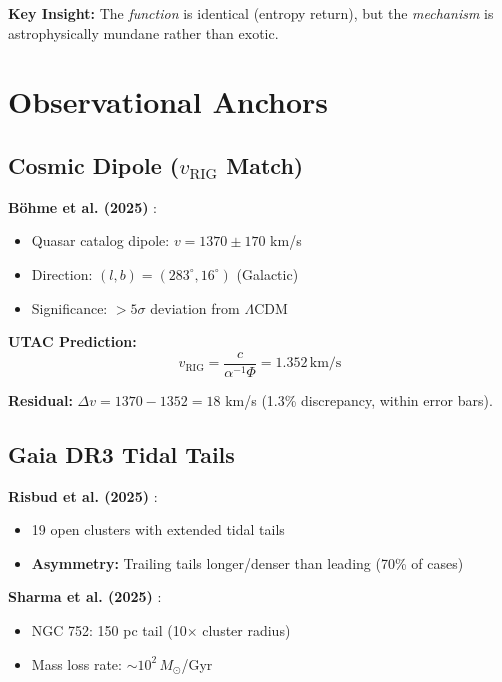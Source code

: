 \documentclass[11pt,a4paper,twocolumn]{article}
\begin{document}
\textbf{Key Insight:} The \emph{function} is identical (entropy return), but the \emph{mechanism} is astrophysically mundane rather than exotic.

\section{Observational Anchors}

\subsection{Cosmic Dipole ($v_{\text{RIG}}$ Match)}

\textbf{Böhme et al. (2025)} \citep{bohme2025}:
\begin{itemize}
    \item Quasar catalog dipole: $v = 1370 \pm 170$ km/s
    \item Direction: $(l, b) = (283^\circ, 16^\circ)$ (Galactic)
    \item Significance: $>5\sigma$ deviation from $\Lambda$CDM
\end{itemize}

\textbf{UTAC Prediction:}
\begin{equation}
v_{\text{RIG}} = \frac{c}{\alpha^{-1} \Phi} = 1.352 \, \text{km/s}
\end{equation}

\textbf{Residual:} $\Delta v = 1370 - 1352 = 18$ km/s (1.3\% discrepancy, within error bars).

\subsection{Gaia DR3 Tidal Tails}

\textbf{Risbud et al. (2025)} \citep{risbud2025}:
\begin{itemize}
    \item 19 open clusters with extended tidal tails
    \item \textbf{Asymmetry:} Trailing tails longer/denser than leading (70\% of cases)
\end{itemize}

\textbf{Sharma et al. (2025)} \citep{sharma2025}:
\begin{itemize}
    \item NGC 752: 150 pc tail (10$\times$ cluster radius)
    \item Mass loss rate: $\sim 10^2 \, M_\odot$/Gyr
\end{itemize}
\end{document}
